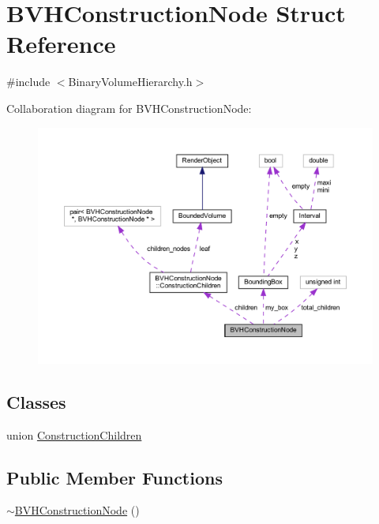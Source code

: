 \hypertarget{structBVHConstructionNode}{}\section{B\+V\+H\+Construction\+Node Struct Reference}
\label{structBVHConstructionNode}


{\ttfamily \#include $<$Binary\+Volume\+Hierarchy.\+h$>$}



Collaboration diagram for B\+V\+H\+Construction\+Node\+:
\nopagebreak
\begin{figure}[H]
\begin{center}
\leavevmode
\includegraphics[width=350pt]{structBVHConstructionNode__coll__graph}
\end{center}
\end{figure}
\subsection*{Classes}
\begin{DoxyCompactItemize}
\item 
union \mbox{\hyperlink{unionBVHConstructionNode_1_1ConstructionChildren}{Construction\+Children}}
\end{DoxyCompactItemize}
\subsection*{Public Member Functions}
\begin{DoxyCompactItemize}
\item 
\mbox{\hyperlink{structBVHConstructionNode_af28961a656f19c0a72ad44c69db2b01d}{$\sim$\+B\+V\+H\+Construction\+Node}} ()
\end{DoxyCompactItemize}
